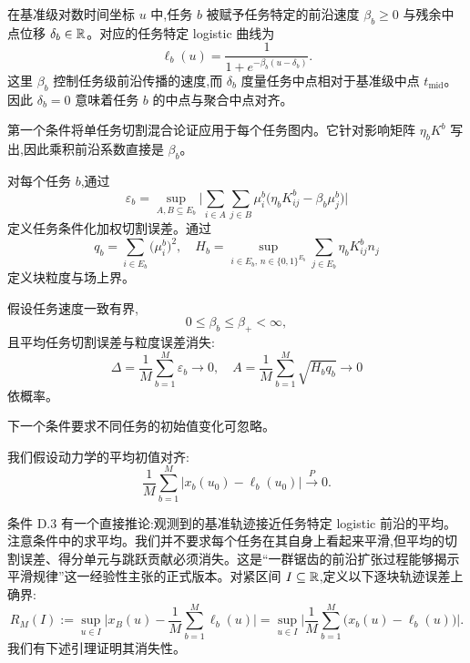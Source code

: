\begin{definition}
在基准级对数时间坐标 $u$ 中,任务 $b$ 被赋予任务特定的前沿速度 $\beta_{b} \geq 0$ 与残余中点位移 $\delta_{b} \in \mathbb{R}$。对应的任务特定 logistic 曲线为
\[
    \ell_{b}(u) = \frac{1}{1 + e^{-\beta_{b} (u - \delta_{b})}}. \tag{10}
\]
这里 $\beta_{b}$ 控制任务级前沿传播的速度,而 $\delta_{b}$ 度量任务中点相对于基准级中点 $t_{\mathrm{mid}}$。因此 $\delta_{b} = 0$ 意味着任务 $b$ 的中点与聚合中点对齐。
\end{definition}

第一个条件将单任务切割混合论证应用于每个任务图内。它针对影响矩阵 $\eta_{b} K^{b}$ 写出,因此乘积前沿系数直接是 $\beta_{b}$。

\begin{definition}[逐块加权切割误差与场上界]
对每个任务 $b$,通过
\[
    \varepsilon_{b} = \sup_{A, B \subseteq E_{b}} \biggl| \sum_{i \in A} \sum_{j \in B} \mu^{b}_{i} \bigl( \eta_{b} K^{b}_{ij} - \beta_{b} \mu^{b}_{j} \bigr) \biggr| \tag{11}
\]
定义任务条件化加权切割误差。通过
\[
    q_{b} = \sum_{i \in E_{b}} \bigl( \mu^{b}_{i} \bigr)^{2}, \quad
    H_{b} = \sup_{i \in E_{b},\, n \in \{0, 1\}^{E_{b}}} \sum_{j \in E_{b}} \eta_{b} K^{b}_{ij} n_{j}
\]
定义块粒度与场上界。
\end{definition}

\begin{condition}[逐块加权切割混合与消失的得分单元]
假设任务速度一致有界,
\[
    0 \leq \beta_{b} \leq \beta_{+} < \infty,
\]
且平均任务切割误差与粒度误差消失:
\[
    \Delta = \frac{1}{M} \sum_{b=1}^{M} \varepsilon_{b} \to 0, \quad
    A = \frac{1}{M} \sum_{b=1}^{M} \sqrt{H_{b} q_{b}} \to 0 \tag{12}
\]
依概率。
\end{condition}

下一个条件要求不同任务的初始值变化可忽略。

\begin{condition}[逐块初始对齐]
我们假设动力学的平均初值对齐:
\[
    \frac{1}{M} \sum_{b=1}^{M} \bigl| x_{b}(u_{0}) - \ell_{b}(u_{0}) \bigr| \xrightarrow{P} 0.
\]
\end{condition}

条件 D.3 有一个直接推论:观测到的基准轨迹接近任务特定 logistic 前沿的平均。注意条件中的求平均。我们并不要求每个任务在其自身上看起来平滑,但平均的切割误差、得分单元与跳跃贡献必须消失。这是``一群锯齿的前沿扩张过程能够揭示平滑规律''这一经验性主张的正式版本。对紧区间 $I \subseteq \mathbb{R}$,定义以下逐块轨迹误差上确界:
\[
    R_{M}(I) := \sup_{u \in I} \biggl| x_{B}(u) - \frac{1}{M} \sum_{b=1}^{M} \ell_{b}(u) \bigr| = \sup_{u \in I} \biggl| \frac{1}{M} \sum_{b=1}^{M} \bigl( x_{b}(u) - \ell_{b}(u) \bigr) \bigr|. \tag{13}
\]
我们有下述引理证明其消失性。

